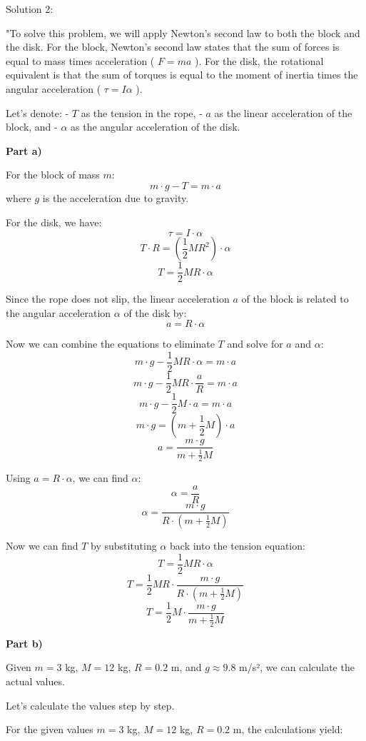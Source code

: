 Solution 2:

"To solve this problem, we will apply Newton's second law to both the block and the disk. For the block, Newton's second law states that the sum of forces is equal to mass times acceleration ( \( F = ma \) ). For the disk, the rotational equivalent is that the sum of torques is equal to the moment of inertia times the angular acceleration ( \( \tau = I\alpha \) ).

Let's denote:
- \( T \) as the tension in the rope,
- \( a \) as the linear acceleration of the block, and
- \( \alpha \) as the angular acceleration of the disk.

\textbf{Part a)}

For the block of mass \( m \):
\[ m \cdot g - T = m \cdot a \]
where \( g \) is the acceleration due to gravity.

For the disk, we have:
\[ \tau = I \cdot \alpha \]
\[ T \cdot R = \left( \frac{1}{2} M R^2 \right) \cdot \alpha \]
\[ T = \frac{1}{2} M R \cdot \alpha \]

Since the rope does not slip, the linear acceleration \( a \) of the block is related to the angular acceleration \( \alpha \) of the disk by:
\[ a = R \cdot \alpha \]

Now we can combine the equations to eliminate \( T \) and solve for \( a \) and \( \alpha \):
\[ m \cdot g - \frac{1}{2} M R \cdot \alpha = m \cdot a \]
\[ m \cdot g - \frac{1}{2} M R \cdot \frac{a}{R} = m \cdot a \]
\[ m \cdot g - \frac{1}{2} M \cdot a = m \cdot a \]
\[ m \cdot g = \left( m + \frac{1}{2} M \right) \cdot a \]
\[ a = \frac{m \cdot g}{m + \frac{1}{2} M} \]

Using \( a = R \cdot \alpha \), we can find \( \alpha \):
\[ \alpha = \frac{a}{R} \]
\[ \alpha = \frac{m \cdot g}{R \cdot \left( m + \frac{1}{2} M \right)} \]

Now we can find \( T \) by substituting \( \alpha \) back into the tension equation:
\[ T = \frac{1}{2} M R \cdot \alpha \]
\[ T = \frac{1}{2} M R \cdot \frac{m \cdot g}{R \cdot \left( m + \frac{1}{2} M \right)} \]
\[ T = \frac{1}{2} M \cdot \frac{m \cdot g}{m + \frac{1}{2} M} \]

\textbf{Part b)}

Given \( m = 3 \) kg, \( M = 12 \) kg, \( R = 0.2 \) m, and \( g \approx 9.8 \) m/s², we can calculate the actual values.

Let's calculate the values step by step.

For the given values \( m = 3 \) kg, \( M = 12 \) kg, \( R = 0.2 \) m, the calculations yield:

